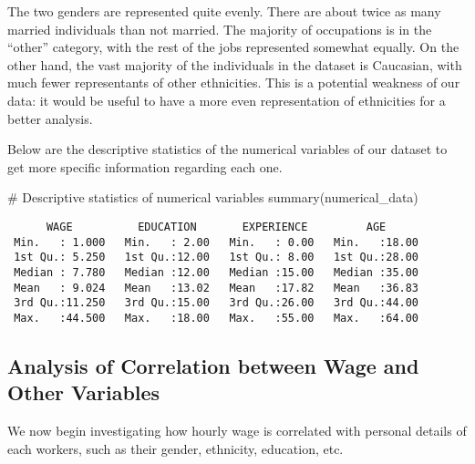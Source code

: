 \documentclass[
  letterpaper,
  DIV=11,
  numbers=noendperiod]{scrartcl}
\newenvironment{Shaded}{\begin{snugshade}}{\end{snugshade}}
\newcommand{\CommentTok}[1]{\textcolor[rgb]{0.37,0.37,0.37}{#1}}
\newcommand{\FunctionTok}[1]{\textcolor[rgb]{0.28,0.35,0.67}{#1}}
\newcommand{\NormalTok}[1]{\textcolor[rgb]{0.00,0.23,0.31}{#1}}
\begin{document}
The two genders are represented quite evenly. There are about twice as
many married individuals than not married. The majority of occupations
is in the ``other'' category, with the rest of the jobs represented
somewhat equally. On the other hand, the vast majority of the
individuals in the dataset is Caucasian, with much fewer representants
of other ethnicities. This is a potential weakness of our data: it would
be useful to have a more even representation of ethnicities for a better
analysis.

Below are the descriptive statistics of the numerical variables of our
dataset to get more specific information regarding each one.

\begin{Shaded}
\begin{Highlighting}[]
\CommentTok{\# Descriptive statistics of numerical variables}
\FunctionTok{summary}\NormalTok{(numerical\_data)}
\end{Highlighting}
\end{Shaded}

\begin{verbatim}
      WAGE          EDUCATION       EXPERIENCE         AGE       
 Min.   : 1.000   Min.   : 2.00   Min.   : 0.00   Min.   :18.00  
 1st Qu.: 5.250   1st Qu.:12.00   1st Qu.: 8.00   1st Qu.:28.00  
 Median : 7.780   Median :12.00   Median :15.00   Median :35.00  
 Mean   : 9.024   Mean   :13.02   Mean   :17.82   Mean   :36.83  
 3rd Qu.:11.250   3rd Qu.:15.00   3rd Qu.:26.00   3rd Qu.:44.00  
 Max.   :44.500   Max.   :18.00   Max.   :55.00   Max.   :64.00  
\end{verbatim}

\hypertarget{analysis-of-correlation-between-wage-and-other-variables}{%
\subsection{Analysis of Correlation between Wage and Other
Variables}\label{analysis-of-correlation-between-wage-and-other-variables}}

We now begin investigating how hourly wage is correlated with personal
details of each workers, such as their gender, ethnicity, education,
etc.
\end{document}
